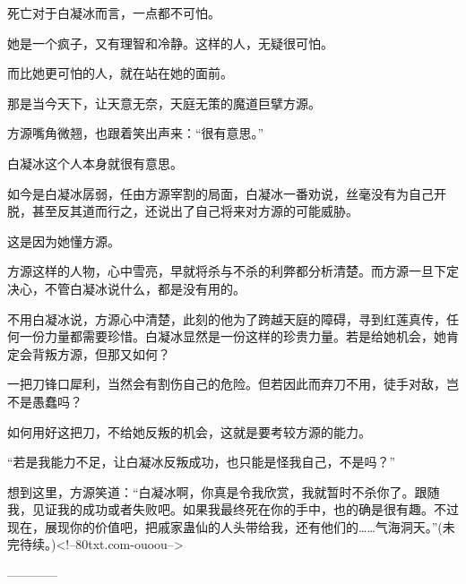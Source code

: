 \begin{this_body}
死亡对于白凝冰而言，一点都不可怕。

她是一个疯子，又有理智和冷静。这样的人，无疑很可怕。

而比她更可怕的人，就在站在她的面前。

那是当今天下，让天意无奈，天庭无策的魔道巨擘方源。

方源嘴角微翘，也跟着笑出声来：“很有意思。”

白凝冰这个人本身就很有意思。

如今是白凝冰孱弱，任由方源宰割的局面，白凝冰一番劝说，丝毫没有为自己开脱，甚至反其道而行之，还说出了自己将来对方源的可能威胁。

这是因为她懂方源。

方源这样的人物，心中雪亮，早就将杀与不杀的利弊都分析清楚。而方源一旦下定决心，不管白凝冰说什么，都是没有用的。

不用白凝冰说，方源心中清楚，此刻的他为了跨越天庭的障碍，寻到红莲真传，任何一份力量都需要珍惜。白凝冰显然是一份这样的珍贵力量。若是给她机会，她肯定会背叛方源，但那又如何？

一把刀锋口犀利，当然会有割伤自己的危险。但若因此而弃刀不用，徒手对敌，岂不是愚蠢吗？

如何用好这把刀，不给她反叛的机会，这就是要考较方源的能力。

“若是我能力不足，让白凝冰反叛成功，也只能是怪我自己，不是吗？”

想到这里，方源笑道：“白凝冰啊，你真是令我欣赏，我就暂时不杀你了。跟随我，见证我的成功或者失败吧。如果我最终死在你的手中，也的确是很有趣。不过现在，展现你的价值吧，把戚家蛊仙的人头带给我，还有他们的……气海洞天。”(未完待续。)<!--80txt.com-ouoou-->

------------

\end{this_body}

